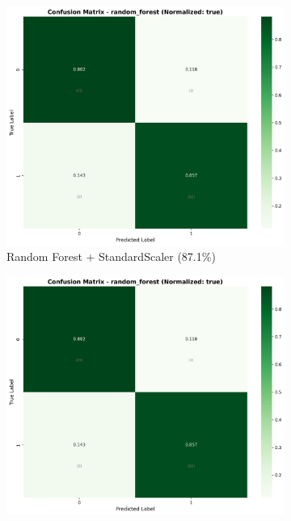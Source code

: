 \begin{figure}[H]
\centering
\begin{subfigure}[b]{0.315\textwidth}
\centering
\includegraphics[width=1\textwidth]{Result/cleveland_dataset/confusion_matrices/random_forest_numeric_dataset_StandardScaler.png}
\caption{Random Forest + StandardScaler (87.1\%)}
\label{fig:rf_standardscaler_complete}
\end{subfigure}
\hfill
\begin{subfigure}[b]{0.315\textwidth}
\centering
\includegraphics[width=1\textwidth]{Result/cleveland_dataset/confusion_matrices/random_forest_numeric_dataset_MinMaxScaler.png}

\end{subfigure}
\end{figure}
